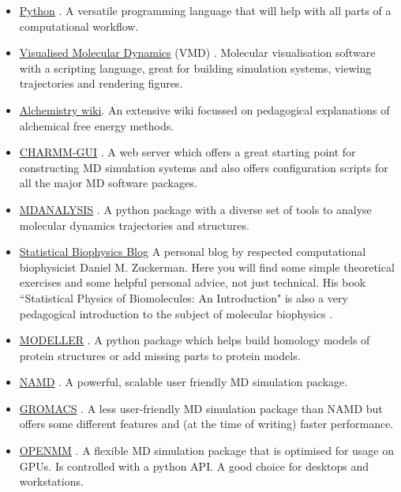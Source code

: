 \begin{itemize}
	\item \href{https://www.python.org/about/gettingstarted/}{Python} \cite{van1995python}. A versatile programming language that will help with all parts of a computational workflow.
	\item \href{https://www.ks.uiuc.edu/Research/vmd/}{Visualised Molecular Dynamics} (VMD) \cite{humphrey1996}. Molecular visualisation software with a scripting language, great for building simulation systems, viewing trajectories and rendering figures. 
	\item \href{http://alchemistry.org/wiki/Main_Page}{Alchemistry wiki}. An extensive wiki focussed on pedagogical explanations of alchemical free energy methods. 
	\item \href{https://charmm-gui.org}{CHARMM-GUI} \cite{mallajosyula2015}. A web server which offers a great starting point for constructing MD simulation systems and also offers configuration scripts for all the major MD software packages.
	\item \href{https://www.mdanalysis.org/}{MDANALYSIS} \cite{michaud-agrawal2011, gowers2016}. A python package with a diverse set of tools to analyse molecular dynamics trajectories and structures. 
	\item \href{http://statisticalbiophysicsblog.org/}{Statistical Biophysics Blog} A personal blog by respected computational biophysicist Daniel M. Zuckerman. Here you will find some simple theoretical exercises and some helpful personal advice, not just technical. His book ``Statistical Physics of Biomolecules: An Introduction" is also a very pedagogical introduction to the subject of molecular biophysics \cite{zuckerman2010}.
	\item \href{https://salilab.org/modeller/}{MODELLER} \cite{sali1993, shen2006, webb2016}. A python package which helps build homology models of protein structures or add missing parts to protein models.
	\item \href{https://www.ks.uiuc.edu/Research/namd/}{NAMD} \cite{phillips2005}. A powerful, scalable user friendly MD simulation package.
	\item \href{https://manual.gromacs.org/current/index.html}{GROMACS} \cite{abraham2015}. A less user-friendly MD simulation package than NAMD but offers some different features and (at the time of writing) faster performance.
	\item \href{https://openmm.org/}{OPENMM} \cite{eastman2017}. A flexible MD simulation package that is optimised for usage on GPUs. Is controlled with a python API. A good choice for desktops and workstations.

\end{itemize}
